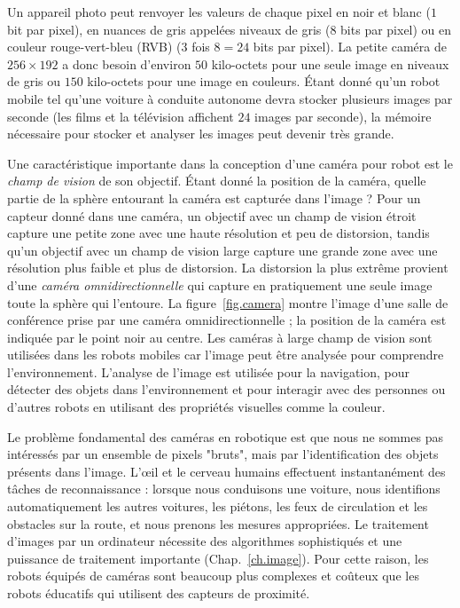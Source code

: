 Un appareil photo peut renvoyer les valeurs de chaque pixel en noir et blanc ($1$ bit par pixel), en nuances de gris appelées niveaux de gris ($8$ bits par pixel) ou en couleur rouge-vert-bleu (RVB) ($3$ fois $8=24$ bits par pixel). La petite caméra de $256\times 192$ a donc besoin d'environ $50$ kilo-octets pour une seule image en niveaux de gris ou $150$ kilo-octets pour une image en couleurs. Étant donné qu'un robot mobile tel qu'une voiture à conduite autonome devra stocker plusieurs images par seconde (les films et la télévision affichent $24$ images par seconde), la mémoire nécessaire pour stocker et analyser les images peut devenir très grande.

Une caractéristique importante dans la conception d'une caméra pour  robot est le \emph{champ de vision} de son objectif. Étant donné la position de la caméra, quelle partie de la sphère entourant la caméra est capturée dans l'image ? Pour un capteur donné dans une caméra, un objectif avec un champ de vision étroit capture une petite zone avec une haute résolution et peu de distorsion, tandis qu'un objectif avec un champ de vision large capture une grande zone avec une résolution plus faible et plus de distorsion. La distorsion la plus extrême provient d'une \emph{caméra omnidirectionnelle} qui capture en pratiquement une seule image toute la sphère qui l'entoure. La figure~\ref{fig.camera} montre l'image d'une salle de conférence prise par une caméra omnidirectionnelle ; la position de la caméra est indiquée par le point noir au centre. Les caméras à large champ de vision sont utilisées dans les robots mobiles car l'image peut être analysée pour comprendre l'environnement. L'analyse de l'image est utilisée pour la navigation, pour détecter des objets dans l'environnement et pour interagir avec des personnes ou d'autres robots en utilisant des propriétés visuelles comme la couleur.

Le problème fondamental des caméras en robotique est que nous ne sommes pas intéressés par un ensemble de pixels "bruts", mais par l'identification des objets présents dans l'image. L'œil et le cerveau humains effectuent instantanément des tâches de reconnaissance : lorsque nous conduisons une voiture, nous identifions automatiquement les autres voitures, les piétons, les feux de circulation et les obstacles sur la route, et nous prenons les mesures appropriées. Le traitement d'images par un ordinateur nécessite des algorithmes sophistiqués et une puissance de traitement importante (Chap.~\ref{ch.image}). Pour cette raison, les robots équipés de caméras sont beaucoup plus complexes et coûteux que les robots éducatifs qui utilisent des capteurs de proximité.

